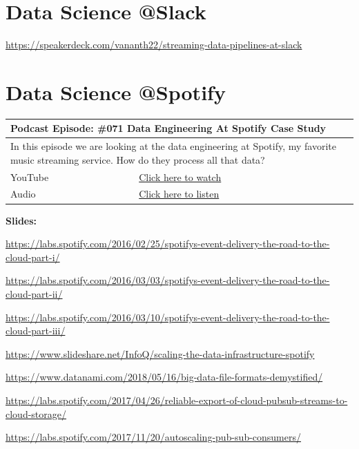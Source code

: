 \documentclass[12pt, numbers=noenddot]{scrreprt} %
\begin{document}
\section{Data Science @Slack}
\url{https://speakerdeck.com/vananth22/streaming-data-pipelines-at-slack}

\section{Data Science @Spotify}

\begin{table}[h]
\begin{tabular}{ll}
\hline
\multicolumn{2}{l}{\textbf{Podcast Episode:} \#071 Data Engineering At Spotify Case Study} \\ \hline
\multicolumn{2}{p{15cm}}{In this episode we are looking at the data engineering at Spotify, my favorite music streaming service. How do they process all that data?}         \\ \hline
\multicolumn{1}{l|}{YouTube}   & \href{https://youtu.be/0WJZ5wtQRWI}{Click here to watch}   \\ 
\multicolumn{1}{l|}{Audio}     & \href{https://anchor.fm/andreaskayy/episodes/071-Data-Engineering-At-Spotify-Case-Study-e45iq1}{Click here to listen}   \\ \hline
\end{tabular}
 \label{tbl:spotifycasestudy}
\end{table}

\textbf{Slides:}

\url{https://labs.spotify.com/2016/02/25/spotifys-event-delivery-the-road-to-the-cloud-part-i/}

\url{https://labs.spotify.com/2016/03/03/spotifys-event-delivery-the-road-to-the-cloud-part-ii/}

\url{https://labs.spotify.com/2016/03/10/spotifys-event-delivery-the-road-to-the-cloud-part-iii/}

\url{https://www.slideshare.net/InfoQ/scaling-the-data-infrastructure-spotify}

\url{https://www.datanami.com/2018/05/16/big-data-file-formats-demystified/}

\url{https://labs.spotify.com/2017/04/26/reliable-export-of-cloud-pubsub-streams-to-cloud-storage/}

\url{https://labs.spotify.com/2017/11/20/autoscaling-pub-sub-consumers/}
\end{document}
